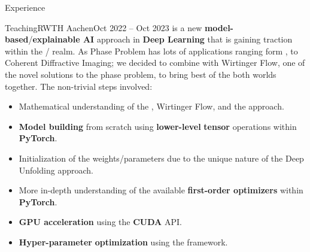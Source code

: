 \begin{cvsection}{Experience}
\begin{cvsubsection}{Teaching}{RWTH Aachen}{Oct 2022 -- Oct 2023}
		 is a new \textbf{model-based}/\textbf{explainable AI} approach in \textbf{Deep Learning} that is gaining traction within the / realm. 
		As Phase Problem has lots of applications ranging form ,  to Coherent Diffractive Imaging; 
		we decided to combine  with Wirtinger Flow, one of the novel solutions to the phase problem, to bring best of the both worlds together. The non-trivial steps involved: 
		\begin{itemize}
			\item Mathematical understanding of the , Wirtinger Flow, and the  approach.
			\item \textbf{Model building} from scratch using \textbf{lower-level} \textbf{tensor} operations within \textbf{PyTorch}.
			\item Initialization of the weights/parameters due to the unique nature of the Deep Unfolding approach.
			\item More in-depth understanding of the available \textbf{first-order optimizers} within \textbf{PyTorch}.
			\item \textbf{GPU acceleration} using the \textbf{CUDA} API.
			\item \textbf{Hyper-parameter} \textbf{optimization} using the  framework.
		\end{itemize}
	\end{cvsubsection}


	
\end{cvsection}